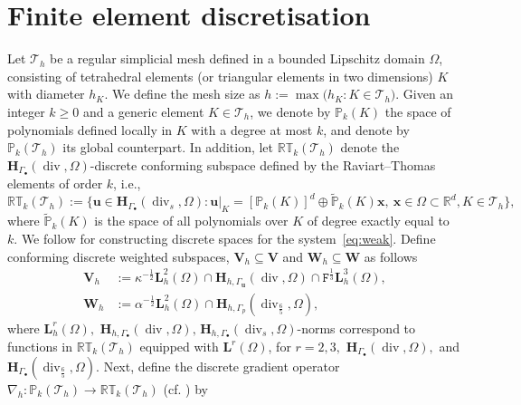 \documentclass[11pt, reqno, a4paper, twoside]{article}
\newcommand{\bu}{\boldsymbol{u}}
\newcommand{\bx}{\boldsymbol{x}}
\newcommand{\rF}{\mathtt{F}}
\newcommand{\bH}{\mathbf{H}}
\newcommand{\bL}{\mathbf{L}}
\newcommand{\bW}{\mathbf{W}}
\newcommand{\bV}{\mathbf{V}}
\newcommand{\cT}{\mathcal{T}}
\newcommand\vdiv{\mathop{\mathrm{div}}\nolimits}
\numberwithin{equation}{section}
\numberwithin{remark}{section}
\numberwithin{figure}{section}
\numberwithin{table}{section}
\begin{document}
{\section{Finite element discretisation}\label{sec:fe}
Let \( {\cT}_h \) be a regular simplicial mesh defined in a bounded Lipschitz domain \( \Omega \), consisting of tetrahedral elements (or triangular elements in two dimensions) \( K \) with diameter \( h_K \). We define the mesh size as \( h := \max\bigl(h_K : K \in {\cT}_h\bigr) \). Given an integer \( k \geq 0 \) and a generic element \( K \in {\cT}_h \), we denote by \( \mathbb{P}_k(K) \) the space of polynomials defined locally in \( K \) with a degree at most \( k \), and denote by \( \mathbb{P}_k(\cT_h) \) its global counterpart. In addition, let ${\mathbb{RT}_k(\cT_h)}$ denote the \( \mathbf{H}_{\Gamma_{\bullet}}({\vdiv}, \Omega) \)-discrete conforming subspace defined by the Raviart--Thomas  elements of order \( k \), i.e.,  
\[{\mathbb{RT}_k(\cT_h)} := \{ \bu \in \mathbf{H}_{\Gamma_{\bullet}}({\vdiv_s}, \Omega):\bu|_{K} = [\mathbb{P}_k(K)]^d \oplus \widetilde{\mathbb{P}}_k(K) \bx, \ \bx \in \Omega \subset \mathbb{R}^d, K \in {\cT}_h \},\]
where \( \widetilde{\mathbb{P}}_k(K) \) is the space of all polynomials over \( K \) of degree exactly equal to \( k.\)
{We follow \cite[Section~4]{dhpr_sinum26} for constructing discrete spaces for the system~\eqref{eq:weak}. Define conforming discrete weighted subspaces, \(\bV_h\subseteq\bV\) and \(\bW_h\subseteq\bW\) as follows 
\begin{subequations}
\begin{align}
 \bV_h&:=  \kappa^{-\frac{1}{2}}\bL_h^2(\Omega) \cap \bH_{h,\Gamma_{\bu}}(\vdiv,\Omega) \cap \rF^{\frac13} \bL_h^3(\Omega),\label{eq:discrete.Vh}\\
  \bW_h&:= \alpha^{-\frac12}\bL^2_h(\Omega)\cap\bH_{h,\Gamma_p}(\vdiv_{\frac65},\Omega), \label{eq:discrete.Wh}
 \end{align}\end{subequations}
 where \( {\bL}_h^r(\Omega), \,\,{\bH}_{{h,\Gamma_{\bullet}}}({\vdiv}, \Omega), \,{\bH}_{{h,\Gamma_{\bullet}}}({\vdiv}_s, \Omega) \)-norms correspond to  functions in ${\mathbb{RT}_k(\cT_h)}$ equipped with  ${\bL}^r(\Omega)$, for \(r=2,3,\) {$\bH_{\Gamma_{\bullet}}(\vdiv,\Omega),$ and $\bH_{\Gamma_{\bullet}}(\vdiv_{\frac65},\Omega)$}.
Next, define the discrete gradient operator \( \nabla_h: {\mathbb{P}_k(\cT_h)} \to {\mathbb{RT}_k(\cT_h)} \) (cf. \cite[Equation~3.1]{arnold1997preconditioning}) by 
}}
\end{document}
